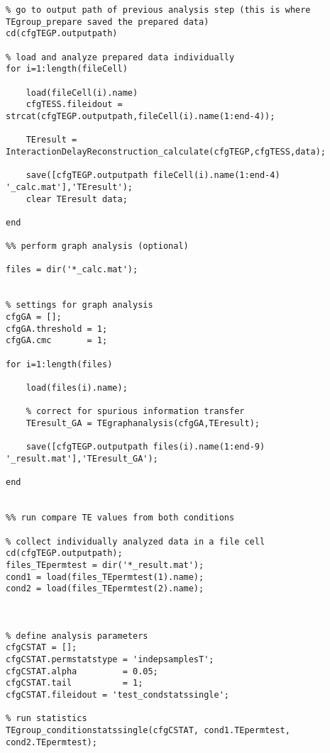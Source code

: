 \begin{lstlisting}
% go to output path of previous analysis step (this is where TEgroup_prepare saved the prepared data)
cd(cfgTEGP.outputpath)

% load and analyze prepared data individually
for i=1:length(fileCell)
        
    load(fileCell(i).name)
    cfgTESS.fileidout = strcat(cfgTEGP.outputpath,fileCell(i).name(1:end-4));
    
    TEresult = InteractionDelayReconstruction_calculate(cfgTEGP,cfgTESS,data);
    
    save([cfgTEGP.outputpath fileCell(i).name(1:end-4) '_calc.mat'],'TEresult');
    clear TEresult data;
    
end

%% perform graph analysis (optional)

files = dir('*_calc.mat');


% settings for graph analysis
cfgGA = [];
cfgGA.threshold = 1;
cfgGA.cmc       = 1;

for i=1:length(files)
    
    load(files(i).name);
    
    % correct for spurious information transfer
    TEresult_GA = TEgraphanalysis(cfgGA,TEresult);
    
    save([cfgTEGP.outputpath files(i).name(1:end-9) '_result.mat'],'TEresult_GA');
    
end


%% run compare TE values from both conditions

% collect individually analyzed data in a file cell
cd(cfgTEGP.outputpath);
files_TEpermtest = dir('*_result.mat');
cond1 = load(files_TEpermtest(1).name);
cond2 = load(files_TEpermtest(2).name);



% define analysis parameters
cfgCSTAT = [];
cfgCSTAT.permstatstype = 'indepsamplesT';
cfgCSTAT.alpha 	       = 0.05;
cfgCSTAT.tail 	       = 1;
cfgCSTAT.fileidout = 'test_condstatssingle';

% run statistics
TEgroup_conditionstatssingle(cfgCSTAT, cond1.TEpermtest, cond2.TEpermtest);
\end{lstlisting}